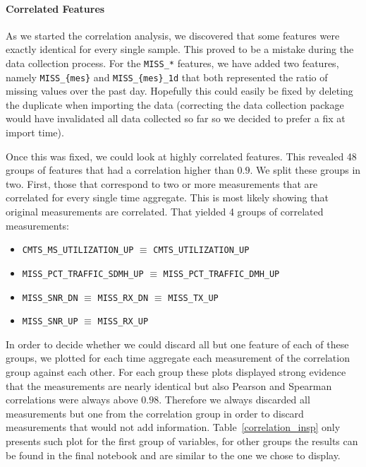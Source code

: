 \paragraph{Correlated Features}
As we started the correlation analysis, we discovered that some features were exactly identical for every single sample. This proved to be a mistake during the data collection process. For the \texttt{MISS\_*} features, we have added two features, namely \texttt{MISS\_\{mes\}} and \texttt{MISS\_\{mes\}\_1d} that both represented the ratio of missing values over the past day. Hopefully this could easily be fixed by deleting the duplicate when importing the data (correcting the data collection package would have invalidated all data collected so far so we decided to prefer a fix at import time).

Once this was fixed, we could look at highly correlated features. This revealed 48 groups of features that had a correlation higher than $0.9$. We split these groups in two. First, those that correspond to two or more measurements that are correlated for every single time aggregate. This is most likely showing that original measurements are correlated. That yielded 4 groups of correlated measurements:
\begin{itemize}[noitemsep,topsep=0pt]
	\item \texttt{CMTS\_MS\_UTILIZATION\_UP} $\equiv$ \texttt{CMTS\_UTILIZATION\_UP}
	\item \texttt{MISS\_PCT\_TRAFFIC\_SDMH\_UP}  $\equiv$ \texttt{MISS\_PCT\_TRAFFIC\_DMH\_UP}
	\item \texttt{MISS\_SNR\_DN}  $\equiv$ \texttt{MISS\_RX\_DN}  $\equiv$ \texttt{MISS\_TX\_UP}
	\item \texttt{MISS\_SNR\_UP}  $\equiv$ \texttt{MISS\_RX\_UP}
\end{itemize}
In order to decide whether we could discard all but one feature of each of these groups, we plotted for each time aggregate each measurement of the correlation group against each other. For each group these plots displayed strong evidence that the measurements are nearly identical but also Pearson and Spearman correlations were always above $0.98$. Therefore we always discarded all measurements but one from the correlation group in order to discard measurements that would not add information. Table~\ref{correlation_insp} only presents such plot for the first group of variables, for other groups the results can be found in the final notebook and are similar to the one we chose to display.


